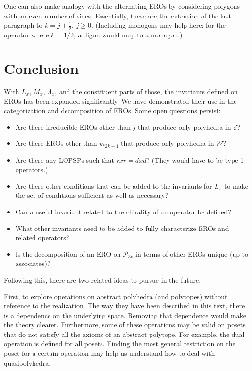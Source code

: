 \documentclass{amsart}[12pt]
\begin{document}
One can also make analogy with the alternating EROs by considering polygons
with an even number of sides. Essentially, these are the extension of the last
paragraph to $k = j + \frac{1}{2}$, $j \ge 0$. (Including monogons may help
here: for the operator where $k=1/2$, a digon would map to a monogon.)

\section{Conclusion}
With $L_x$, $M_x$, $\Lambda_x$, and the constituent parts of those,
the invariants defined on EROs has been expanded significantly. We have
demonstrated their use in the categorization and decomposition of EROs.
Some open questions persist:
\begin{itemize}
\item Are there irreducible EROs other than $j$ that produce only polyhedra in $\mathcal{E}$?
\item Are there EROs other than $m_{2k+1}$ that produce only polyhedra in  $\mathcal{W}$?
\item Are there any LOPSPs such that $rxr = dxd$? (They would have to be type 1 operators.)
\item Are there other conditions that can be added to the invariants for $L_x$ to make the set of conditions sufficient as well as necessary?
\item Can a useful invariant related to the chirality of an operator be defined?
\item What other invariants need to be added to fully characterize EROs and related operators?
\item Is the decomposition of an ERO on $\mathcal{P}_{3v}$ in terms of
  other EROs unique (up to associates)?
\end{itemize}

Following this, there are two related ideas to pursue in the future.

First, to explore operations on abstract polyhedra (and polytopes) without
reference to the realization. The way they have been described in this text,
there is a dependence on the underlying space. Removing that dependence would
make the theory clearer. Furthermore, some of these operations may be valid on
posets that do not satisfy all the axioms of an abstract polytope. For example,
the dual operation is defined for all posets.
Finding the most general restriction on the poset for a certain operation may
help us understand how to deal with quasipolyhedra.
\end{document}
